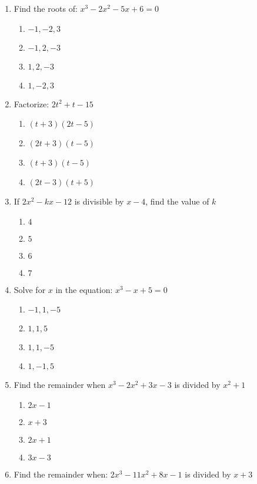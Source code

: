 \begin{multicols}{2}
\begin{enumerate}[label={\arabic*.}]
\begin{enumerate}[label={\Alph*.}]
      \end{enumerate}
    \item Find the roots of: \(x^3 - 2x^2 - 5x + 6 = 0\)
      \begin{enumerate}[label={\Alph*.}]
        \item \(-1, -2, 3\)
        \item \(-1, 2, -3\)
        \item \(1,2,-3\)
        \item \(1,-2,3\)
      \end{enumerate}
    \item Factorize: \(2t^2 + t - 15\)
      \begin{enumerate}[label={\Alph*.}]
        \item \((t+3)(2t-5)\)
        \item \((2t+3)(t-5)\)
        \item \((t+3)(t-5)\)
        \item \((2t-3)(t+5)\)
      \end{enumerate}
    \item If \(2x^2 - kx -12\) is divisible by \(x-4\), find the value of \(k\)
      \begin{enumerate}[label={\Alph*.}]
        \item \(4\)
        \item \(5\)
        \item \(6\)
        \item \(7\)
      \end{enumerate}
    \item Solve for $x$ in the equation: $x^3 - x + 5 = 0$
      \begin{enumerate}[label={\Alph*.}]
        \item \(-1, 1, -5\)
        \item \(1,1,5\)
        \item \(1,1,-5\)
        \item \(1,-1,5\)
      \end{enumerate}
    \item Find the remainder when $x^3 - 2x^2 + 3x -3$ is divided by $x^2 + 1$
      \begin{enumerate}[label={\Alph*.}]
        \item \(2x -1\)
        \item \(x+3\)
        \item \(2x + 1\)
        \item \(3x -3\)
      \end{enumerate}
    \item Find the remainder when: $2x^3 -11x^2 + 8x -1$ is divided by $x+3$

\end{enumerate}
\end{multicols}

